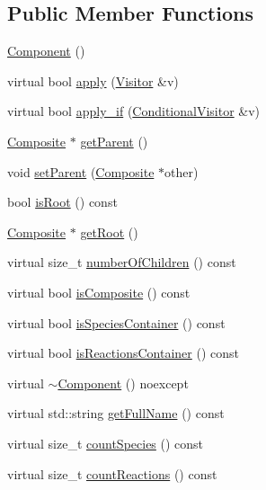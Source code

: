 \subsection*{Public Member Functions}
\begin{DoxyCompactItemize}
\item 
\hyperlink{classchem_1_1Component_a2c7265280625c13151d52a500bcc3095}{Component} ()
\item 
virtual bool \hyperlink{classchem_1_1Component_ae9efcf2fb203ab7514f81f04d7e4dec2}{apply} (\hyperlink{classchem_1_1Visitor}{Visitor} \&v)
\item 
virtual bool \hyperlink{classchem_1_1Component_ac40e9d75a554324ba1d007a2d5234a38}{apply\-\_\-if} (\hyperlink{classchem_1_1ConditionalVisitor}{Conditional\-Visitor} \&v)
\item 
\hyperlink{classchem_1_1Composite}{Composite} $\ast$ \hyperlink{classchem_1_1Component_a32812270ee52f07ceae2194c56864fd6}{get\-Parent} ()
\item 
void \hyperlink{classchem_1_1Component_a1f4e4d1566f1d3026f1e2a14fa3dffd9}{set\-Parent} (\hyperlink{classchem_1_1Composite}{Composite} $\ast$other)
\item 
bool \hyperlink{classchem_1_1Component_a75cd13a0d884f82fcddd574de33fbfe6}{is\-Root} () const 
\item 
\hyperlink{classchem_1_1Composite}{Composite} $\ast$ \hyperlink{classchem_1_1Component_a7f1166f8fb4c9526cd1794ec3c2714f5}{get\-Root} ()
\item 
virtual size\-\_\-t \hyperlink{classchem_1_1Component_a720ec4ef4aaadfec3e47c31451d28637}{number\-Of\-Children} () const 
\item 
virtual bool \hyperlink{classchem_1_1Component_af2c73f75f937d457a55c1e0120833cb8}{is\-Composite} () const 
\item 
virtual bool \hyperlink{classchem_1_1Component_a3c0f652fe5b6910f07c046fe0190b7b5}{is\-Species\-Container} () const 
\item 
virtual bool \hyperlink{classchem_1_1Component_a8c79ee4335fadfcef56b14a62b742457}{is\-Reactions\-Container} () const 
\item 
virtual \hyperlink{classchem_1_1Component_a9a468e72232a30a69d4432d13ac5ffa9}{$\sim$\-Component} () noexcept
\item 
virtual std\-::string \hyperlink{classchem_1_1Component_a1d5884d373fb44fd950d5fe2b0c34e26}{get\-Full\-Name} () const 
\item 
virtual size\-\_\-t \hyperlink{classchem_1_1Component_a581a3912035ba493a2a24f1516d65ea8}{count\-Species} () const 
\item 
virtual size\-\_\-t \hyperlink{classchem_1_1Component_ab061b8b7d97db554af402ebb9723dc4c}{count\-Reactions} () const 
\end{DoxyCompactItemize}
